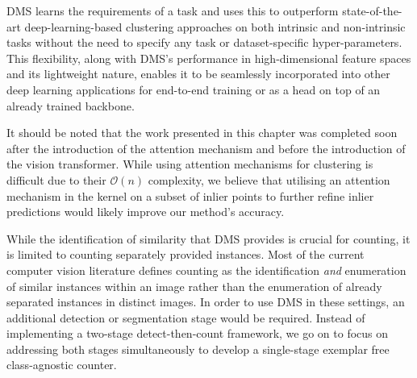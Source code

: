\documentclass[../thesis.tex]{subfiles}
\begin{document}
DMS learns the requirements of a task and uses this to outperform state-of-the-art deep-learning-based clustering approaches on both intrinsic and non-intrinsic tasks without the need to specify any task or dataset-specific hyper-parameters.
This flexibility, along with DMS's performance in high-dimensional feature spaces and its lightweight nature, enables it to be seamlessly incorporated into other deep learning applications for end-to-end training or as a head on top of an already trained backbone.

It should be noted that the work presented in this chapter was completed soon after the introduction of the attention mechanism and before the introduction of the vision transformer.
While using attention mechanisms for clustering is difficult due to their $\mathcal{O}(n)$ complexity, we believe that utilising an attention mechanism in the kernel on a subset of inlier points to further refine inlier predictions would likely improve our method's accuracy.

While the identification of similarity that DMS provides is crucial for counting, it is limited to counting separately provided instances.
Most of the current computer vision literature defines counting as the identification \textit{and} enumeration of similar instances within an image rather than the enumeration of already separated instances in distinct images.
In order to use DMS in these settings, an additional detection or segmentation stage would be required.
Instead of implementing a two-stage detect-then-count framework, we go on to focus on addressing both stages simultaneously to develop a single-stage exemplar free class-agnostic counter.
\end{document}
